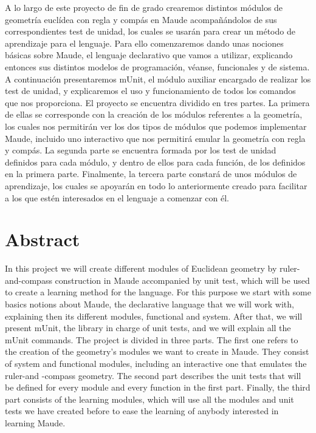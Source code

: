 

A lo largo de este proyecto de fin de grado crearemos distintos módulos de geometría euclídea con regla y compás en Maude acompañándolos de sus correspondientes test de unidad, los cuales se usarán para crear un método de aprendizaje para el lenguaje. Para ello comenzaremos dando unas nociones básicas sobre Maude, el lenguaje declarativo que vamos a utilizar, explicando entonces sus distintos modelos de programación, véanse, funcionales y de sistema. A continuación presentaremos mUnit, el módulo auxiliar encargado de realizar los test de unidad, y explicaremos el uso y funcionamiento de todos los comandos que nos proporciona. El proyecto se encuentra dividido en tres partes. La primera de ellas se corresponde con la creación de los módulos referentes a la geometría, los cuales nos permitirán ver los dos tipos de módulos que podemos implementar Maude, incluido uno interactivo que nos permitirá emular la geometría con regla y compás. La segunda parte se encuentra formada por los test de unidad definidos para cada módulo, y dentro de ellos para cada función, de los definidos en la primera parte. Finalmente, la tercera parte constará de unos módulos de aprendizaje, los cuales se apoyarán en todo lo anteriormente creado para facilitar a los que estén interesados en el lenguaje a comenzar con él. \par

\section*{\huge{Abstract}}

In this project we will create different modules of Euclidean geometry by ruler-and-compass construction in Maude accompanied by unit test, which will be used to create a learning method for the language. For this purpose we start with some basics notions about Maude, the declarative language that we will work with, explaining then its different modules, functional and system. After that, we will present mUnit, the library in charge of unit tests, and we will explain all the mUnit commands. The project is divided in three parts. The first one refers to the creation of the geometry's modules we want to create in Maude. They consist of system and functional modules, including an interactive one that emulates the ruler-and -compass geometry. The second part describes the unit tests that will be defined for every module and every function in the first part. Finally, the third part consists of the learning modules, which will use all the modules and unit tests we have created before to ease the learning of anybody interested in learning Maude. \par
